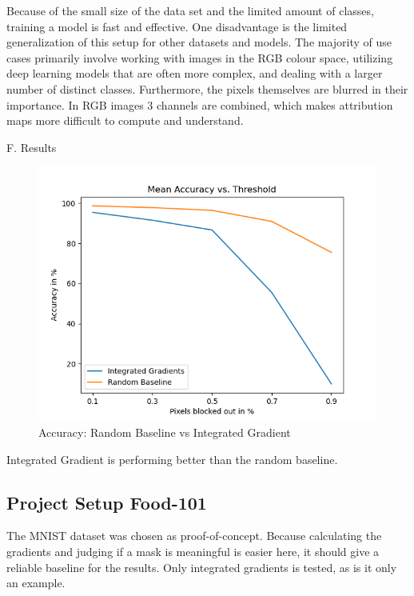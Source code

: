 Because of the small size of the data set and the limited amount of classes, training a model is fast and effective. One disadvantage is the limited generalization of this setup for other datasets and models. The majority of use cases primarily involve working with images in the RGB colour space, utilizing deep learning models that are often more complex, and dealing with a larger number of distinct classes. Furthermore, the pixels themselves are blurred in their importance. In RGB images 3 channels are combined, which makes attribution maps more difficult to compute and understand.

F. Results

\begin{figure}[h!]
	\centering
	\includegraphics[width=150mm]{figs/mean_accuracy_vs_threshold}
	\caption{Accuracy: Random Baseline vs Integrated Gradient}
	\label{fig:Accuracy}
	
\end{figure}

Integrated Gradient is performing better than the random baseline.


\subsection{Project Setup Food-101}

The MNIST dataset \cite{deng2012mnist} was chosen as proof-of-concept. Because calculating the gradients and judging if a mask is meaningful is easier here, it should give a reliable baseline for the results. Only integrated gradients is tested, as is it only an example. 

